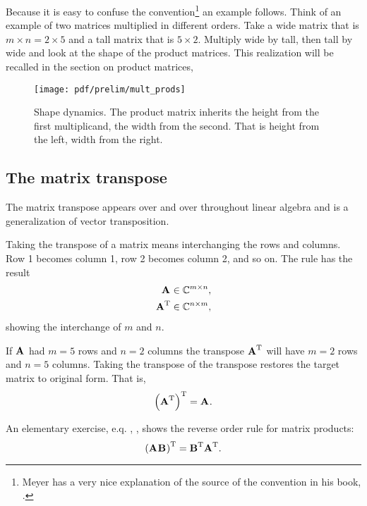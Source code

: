 Because it is easy to confuse the convention\footnote{Meyer has a very nice explanation of the source of the convention in his book, \cite[p. 123]{Meyer}.} an example follows. Think of an example of two matrices multiplied in different orders. Take a wide matrix that is $m \times n = 2\times5$ and a tall matrix that is $5\times 2$. Multiply wide by tall, then tall by wide and look at the shape of the product matrices. This realization will be recalled in the section on product matrices,
\begin{figure}[htbp] %
\texttt{[image: pdf/prelim/mult\_prods]}\\
   \caption{Shape dynamics. The product matrix inherits the height from the first multiplicand, the width from the second. That is height from the left, width from the right.}
   \label{fig:example}
\end{figure}

\subsection{The matrix transpose}
The matrix transpose appears over and over throughout linear algebra and is a generalization of vector transposition.

Taking the transpose of a matrix means interchanging the rows and columns. Row 1 becomes column 1, row 2 becomes column 2, and so on. The rule has the result
\begin{equation}
  \begin{split}
    \textbf{A}^{\mathrm{}}&\in\mathbb{C}^{m \times n},\\
    \textbf{A}^{\mathrm{T}}&\in\mathbb{C}^{n \times m},
  \end{split}
\end{equation}
showing the interchange of $m$ and $n$.

If $\textbf{A}^{\mathrm{}}$ had $m=5$ rows and $n=2$ columns the transpose $\textbf{A}^{\mathrm{T}}$ will have $m=2$ rows and $n=5$ columns. 
Taking the transpose of the transpose restores the target matrix to original form. That is,
\begin{equation}
  \left( \textbf{A}^{\mathrm{T}} \right)^{\mathrm{T}}=\textbf{A}^{\mathrm{}}.
\end{equation}

An elementary exercise, e.q. \cite[p. 10]{Meyer}, \cite[p. 8]{Strang}, shows the reverse order rule for matrix products:
\begin{equation}
  \left( \textbf{A}^{\mathrm{}}\textbf{B}^{\mathrm{}} \right)^{\mathrm{T}}=\textbf{B}^{\mathrm{T}}\textbf{A}^{\mathrm{T}}.
  \label{eq:mattran}
\end{equation}

